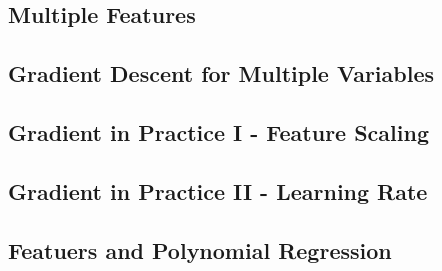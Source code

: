 \documentclass{article}
\begin{document}
\subsection{Multiple Features}
\subsection{Gradient Descent for Multiple Variables}
\subsection{Gradient in Practice I - Feature Scaling}
\subsection{Gradient in Practice II - Learning Rate}
\subsection{Featuers and Polynomial Regression}
 
\end{document}
